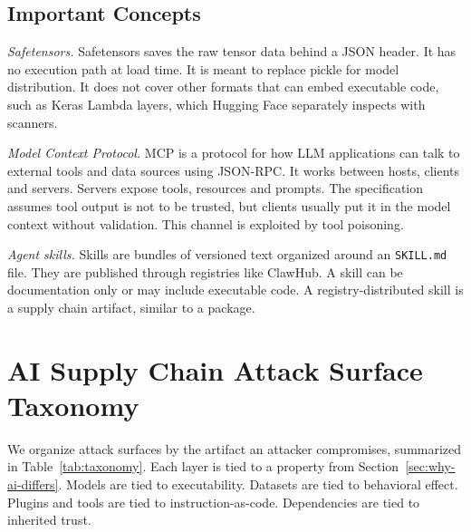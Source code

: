 \documentclass[conference]{IEEEtran}
\begin{document}
\subsection{Important Concepts}
\label{sec:key-concepts}

\emph{Safetensors.} Safetensors saves the raw tensor data behind a JSON header. It has no execution path at load time. It is meant to replace pickle for model distribution. It does not cover other formats that can embed executable code, such as Keras Lambda layers, which Hugging Face separately inspects with scanners.

\emph{Model Context Protocol.} MCP is a protocol for how LLM applications can talk to external tools and data sources using JSON-RPC. It works between hosts, clients and servers. Servers expose tools, resources and prompts. The specification assumes tool output is not to be trusted, but clients usually put it in the model context without validation. This channel is exploited by tool poisoning.

\emph{Agent skills.} Skills are bundles of versioned text organized around an \texttt{SKILL.md} file. They are published through registries like ClawHub. A skill can be documentation only or may include executable code. A registry-distributed skill is a supply chain artifact, similar to a package.

\section{AI Supply Chain Attack Surface Taxonomy}
\label{sec:taxonomy}

We organize attack surfaces by the artifact an attacker compromises, summarized in Table~\ref{tab:taxonomy}. Each layer is tied to a property from Section~\ref{sec:why-ai-differs}. Models are tied to executability. Datasets are tied to behavioral effect. Plugins and tools are tied to instruction-as-code. Dependencies are tied to inherited trust.
\end{document}
